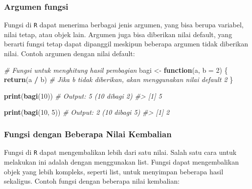 \documentclass[
  oneside]{book}
\newenvironment{Shaded}{\begin{snugshade}}{\end{snugshade}}
\newcommand{\AttributeTok}[1]{\textcolor[rgb]{0.13,0.29,0.53}{#1}}
\newcommand{\CommentTok}[1]{\textcolor[rgb]{0.56,0.35,0.01}{\textit{#1}}}
\newcommand{\ControlFlowTok}[1]{\textcolor[rgb]{0.13,0.29,0.53}{\textbf{#1}}}
\newcommand{\DecValTok}[1]{\textcolor[rgb]{0.00,0.00,0.81}{#1}}
\newcommand{\FunctionTok}[1]{\textcolor[rgb]{0.13,0.29,0.53}{\textbf{#1}}}
\newcommand{\NormalTok}[1]{#1}
\newcommand{\OtherTok}[1]{\textcolor[rgb]{0.56,0.35,0.01}{#1}}
\newcommand{\SpecialCharTok}[1]{\textcolor[rgb]{0.81,0.36,0.00}{\textbf{#1}}}
\begin{document}
\subsubsection*{Argumen fungsi}\label{argumen-fungsi}

Fungsi di \texttt{R} dapat menerima berbagai jenis argumen, yang bisa berupa variabel, nilai tetap, atau objek lain. Argumen juga bisa diberikan nilai default, yang berarti fungsi tetap dapat dipanggil meskipun beberapa argumen tidak diberikan nilai. Contoh argumen dengan nilai default:

\begin{Shaded}
\begin{Highlighting}[]
\CommentTok{\# Fungsi untuk menghitung hasil pembagian}
\NormalTok{bagi }\OtherTok{\textless{}{-}} \ControlFlowTok{function}\NormalTok{(a, }\AttributeTok{b =} \DecValTok{2}\NormalTok{) \{}
  \FunctionTok{return}\NormalTok{(a }\SpecialCharTok{/}\NormalTok{ b)  }\CommentTok{\# Jika b tidak diberikan, akan menggunakan nilai default 2}
\NormalTok{\}}

\FunctionTok{print}\NormalTok{(}\FunctionTok{bagi}\NormalTok{(}\DecValTok{10}\NormalTok{))   }\CommentTok{\# Output: 5 (10 dibagi 2)}
\CommentTok{\#\textgreater{} [1] 5}
\end{Highlighting}
\end{Shaded}

\begin{Shaded}
\begin{Highlighting}[]
\FunctionTok{print}\NormalTok{(}\FunctionTok{bagi}\NormalTok{(}\DecValTok{10}\NormalTok{, }\DecValTok{5}\NormalTok{)) }\CommentTok{\# Output: 2 (10 dibagi 5)}
\CommentTok{\#\textgreater{} [1] 2}
\end{Highlighting}
\end{Shaded}

\subsubsection*{Fungsi dengan Beberapa Nilai Kembalian}\label{fungsi-dengan-beberapa-nilai-kembalian}

Fungsi di \texttt{R} dapat mengembalikan lebih dari satu nilai. Salah satu cara untuk melakukan ini adalah dengan menggunakan list. Fungsi dapat mengembalikan objek yang lebih kompleks, seperti list, untuk menyimpan beberapa hasil sekaligus. Contoh fungsi dengan beberapa nilai kembalian:
\end{document}
